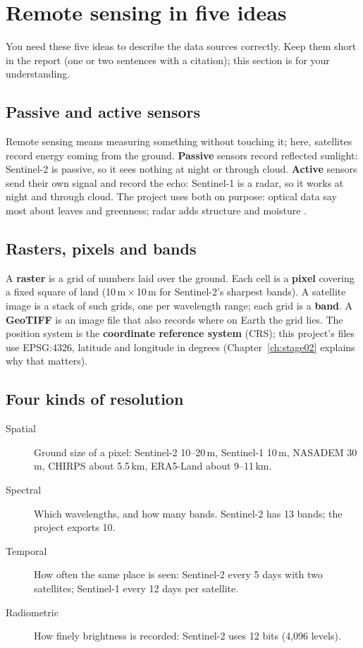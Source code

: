 \section{Remote sensing in five ideas}

You need these five ideas to describe the data sources correctly. Keep them short in the report (one or two sentences with a citation); this section is for your understanding.

\subsection{Passive and active sensors}

Remote sensing means measuring something without touching it; here, satellites record energy coming from the ground. \textbf{Passive} sensors record reflected sunlight: Sentinel-2 is passive, so it sees nothing at night or through cloud. \textbf{Active} sensors send their own signal and record the echo: Sentinel-1 is a radar, so it works at night and through cloud. The project uses both on purpose: optical data say most about leaves and greenness; radar adds structure and moisture \citep{lillesand2015}.

\subsection{Rasters, pixels and bands}

A \textbf{raster} is a grid of numbers laid over the ground. Each cell is a \textbf{pixel} covering a fixed square of land (10\,m\,$\times$\,10\,m for Sentinel-2's sharpest bands). A satellite image is a stack of such grids, one per wavelength range; each grid is a \textbf{band}. A \textbf{GeoTIFF} is an image file that also records where on Earth the grid lies. The position system is the \textbf{coordinate reference system} (CRS); this project's files use EPSG:4326, latitude and longitude in degrees (Chapter~\ref{ch:stage02} explains why that matters).

\subsection{Four kinds of resolution}

\begin{description}
  \item[Spatial] Ground size of a pixel: Sentinel-2 10--20\,m, Sentinel-1 10\,m, NASADEM 30\,m, CHIRPS about 5.5\,km, ERA5-Land about 9--11\,km.
  \item[Spectral] Which wavelengths, and how many bands. Sentinel-2 has 13 bands; the project exports 10.
  \item[Temporal] How often the same place is seen: Sentinel-2 every 5 days with two satellites; Sentinel-1 every 12 days per satellite.
  \item[Radiometric] How finely brightness is recorded: Sentinel-2 uses 12 bits (4,096 levels).
\end{description}

